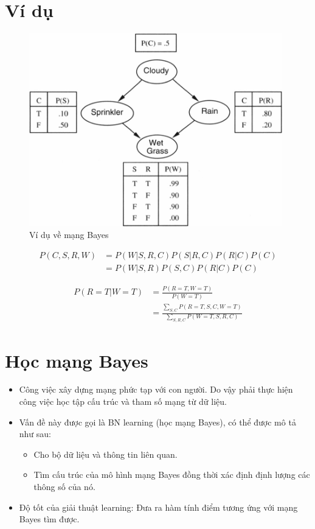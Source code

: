 \documentclass[12pt]{report}
\begin{document}
\section{Ví dụ}
\begin{figure}[h]
\centering
\includegraphics[width=11cm]{vi-du.jpg}
\caption{Ví dụ về mạng Bayes}
\end{figure}

\begin{align*}
P(C, S, R, W)&=P(W| S, R, C) P(S | R, C) P(R | C) P(C) \\
			&= P(W|S, R) P(S, C) P(R|C) P(C) 
\end{align*}

\begin{align*}
P(R=T|W=T) &= \frac{P(R=T, W=T)}{P(W=T)} 			\\
		   &= \frac{\sum_{S, C} P(R=T, S, C, W=T)}{\sum_{S, R, C} P(W=T, S, R, C)}
\end{align*}

\section{Học mạng Bayes}
\begin{itemize}
\item Công việc xây dựng mạng phức tạp với con người. Do vậy phải thực hiện công việc học tập  cấu trúc và tham số mạng từ dữ liệu.
\item Vấn đề này được gọi là BN learning (học mạng Bayes), có thể được mô tả như sau:
\begin{itemize}
\item Cho bộ dữ liệu và thông tin liên quan. 
\item Tìm cấu trúc của mô hình mạng Bayes đồng thời xác định định lượng
	các thông số của nó.
\end{itemize}
\item Độ tốt của giải thuật learning: Đưa ra hàm tính điểm tương ứng với mạng Bayes tìm được.
\end{itemize}
\end{document}
